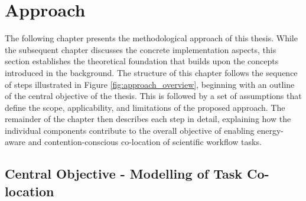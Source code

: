 \section{Approach}
\label{cha:approach}

The following chapter presents the methodological approach of this thesis. While the subsequent chapter discusses the concrete implementation aspects, this section establishes the theoretical foundation that builds upon the concepts introduced in the background. The structure of this chapter follows the sequence of steps illustrated in Figure \ref{fig:approach_overview}, beginning with an outline of the central objective of the thesis. This is followed by a set of assumptions that define the scope, applicability, and limitations of the proposed approach. The remainder of the chapter then describes each step in detail, explaining how the individual components contribute to the overall objective of enabling energy-aware and contention-conscious co-location of scientific workflow tasks.

\subsection{Central Objective - Modelling of Task Co-location}
\label{sec:problem_statement}


